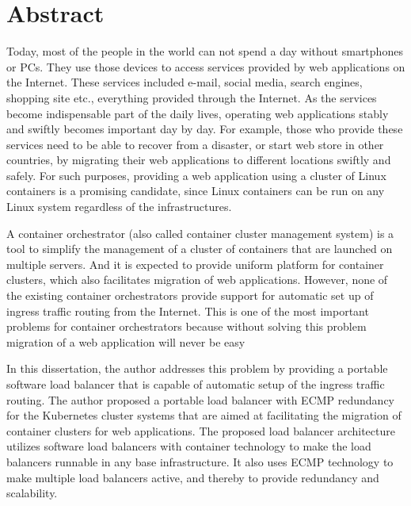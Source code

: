 \chapter*{Abstract}

Today, most of the people in the world can not spend a day without smartphones or PCs.
They use those devices to access services provided by web applications on the Internet.
These services included e-mail, social media, search engines, shopping site etc., everything provided through the Internet.
As the services become indispensable part of the daily lives, operating web applications stably and swiftly becomes important day by day.
For example, those who provide these services need to be able to recover from a disaster, or start web store in other countries,
by migrating their web applications to different locations swiftly and safely.
For such purposes, providing a web application using a cluster of Linux containers is a promising candidate, since Linux containers can be run on any Linux system regardless of the infrastructures.

A container orchestrator (also called container cluster management system) is a tool to simplify the management of a cluster of containers that are launched on multiple servers. And it is expected to provide uniform platform for container clusters, which also facilitates migration of web applications. However, none of the existing container orchestrators provide support for automatic set up of ingress traffic routing from the Internet. This is one of the most important problems for container orchestrators because without solving this problem migration of a web application will never be easy

In this dissertation, the author addresses this problem by providing a portable software load balancer that is capable of automatic setup of the ingress traffic routing.
The author proposed a portable load balancer with ECMP redundancy for the Kubernetes cluster systems that are aimed at facilitating the migration of container clusters for web applications. 
The proposed load balancer architecture utilizes software load balancers with container technology to make the load balancers runnable in any base infrastructure. 
It also uses ECMP technology to make multiple load balancers active, and thereby to provide redundancy and scalability.

